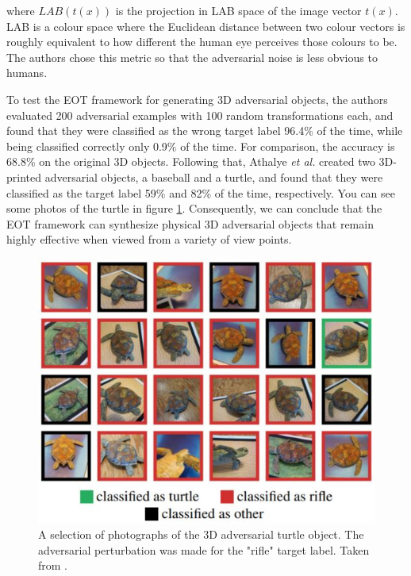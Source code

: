 \noindent where $LAB(t(x))$ is the projection in LAB space of the image vector $t(x)$. LAB is a colour space where the Euclidean distance between two colour vectors is roughly equivalent to how different the human eye perceives those colours to be. The authors chose this metric so that the adversarial noise is less obvious to humans.

To test the EOT framework for generating 3D adversarial objects, the authors evaluated 200 adversarial examples with 100 random transformations each, and found that they were classified as the wrong target label 96.4\% of the time, while being classified correctly only 0.9\% of the time. For comparison, the accuracy is 68.8\% on the original 3D objects. Following that, Athalye \textit{et al.} created two 3D-printed adversarial objects, a baseball and a turtle, and found that they were classified as the target label 59\% and 82\% of the time, respectively. You can see some photos of the turtle in figure \ref{fig:3d_turtle}. Consequently, we can conclude that the EOT framework can synthesize physical 3D adversarial objects that remain highly effective when viewed from a variety of view points.

\begin{figure}[h]
    \centering
    \includegraphics[width=1\textwidth]{graphics/turtle.JPG}
    \caption{A selection of photographs of the 3D adversarial turtle object. The adversarial perturbation was made for the "rifle" target label. Taken from \cite{athalye}.}
    \label{fig:3d_turtle}
\end{figure}

